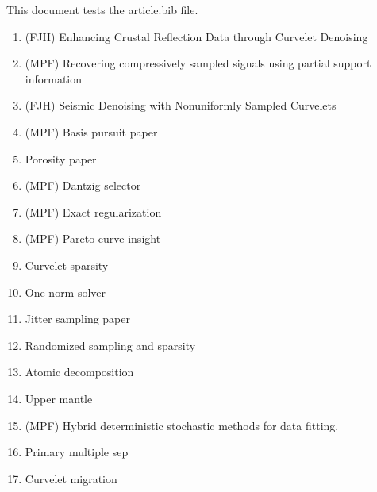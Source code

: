 \documentclass[11 pt]{amsart}
\begin{document}
This document tests the article.bib file. 

\begin{enumerate}

\item (FJH) Enhancing Crustal Reflection Data through Curvelet Denoising~\cite{kumar2010TNPecr}

\item (MPF) Recovering compressively sampled signals using partial support information~\cite{mansour2012IEEETITrcs}

\item (FJH) Seismic Denoising with Nonuniformly Sampled Curvelets~\cite{hennenfent2006CiSEsdn}


\item (MPF) Basis pursuit paper~\cite{berg2008SJSCpareto}

\item Porosity paper~\cite{bernabe2004JGRpas}

\item (MPF) Dantzig selector~\cite{friedlander2007TASdtd}

\item (MPF) Exact regularization~\cite{friedlander2007SJOero}

\item (MPF) Pareto curve insight~\cite{hennenfent2008GEOPnii}

\item Curvelet sparsity~\cite{hennenfent2010GEOPnct}

\item One norm solver~\cite{hennenfent2008GEOPnii}

\item Jitter sampling paper~\cite{hennenfent2008GEOPsdw}

\item Randomized sampling and sparsity~\cite{herrmann2010GEOPrsg}

\item Atomic decomposition~\cite{herrmann2005ICAEsdb}

\item Upper mantle~\cite{herrmann2004GJIssa}

\item (MPF) Hybrid deterministic stochastic methods for data fitting.~\cite{friedlander2011CoRRhybrid}

\item Primary multiple sep~\cite{herrmann2007GJInlp}

\item Curvelet migration~\cite{herrmann2009GEOPcbm}


\end{enumerate}
\end{document}

